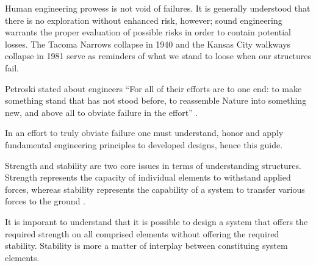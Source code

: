 Human engineering prowess is not void of failures. It is generally understood
that there is no exploration without enhanced risk, however; sound engineering
warrants the proper evaluation of possible risks in order to contain potential
losses. The Tacoma Narrows collapse in 1940
\cite{billah-scanian-resonance-tacoma-narrows-and-phys-textbooks} and the
Kansas City walkways collapse in 1981\cite{kansas-city-walkways-collapse}
serve as reminders of what we stand to loose when our structures fail.

Petroski stated about engineers ``For all of their efforts are to one
end: to make something stand that has not stood before, to reassemble Nature
into something new, and above all to obviate failure in the effort''
\cite{petroski-to-eng-is-human}.

In an effort to truly obviate failure one must understand, honor and apply
fundamental engineering principles to developed designs, hence this guide.

Strength and stability are two core issues in terms of understanding
structures. Strength represents the capacity of individual elements to
withstand applied forces, whereas stability represents the capability of a
system to transfer various forces to the ground
\cite{mit-architectonics-chris-luebkeman}.

It is imporant to understand that it is possible to design a system that offers
the required strength on all comprised elements without offering the required
stability. Stability is more a matter of interplay between constituing system
elements.
